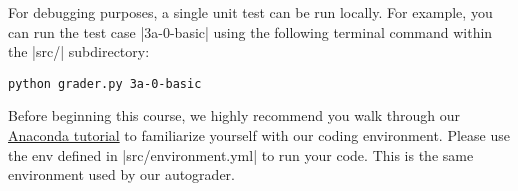 For debugging purposes, a single unit test can be run locally.  For example, you
can run the test case |3a-0-basic| using the following terminal command within
the |src/| subdirectory:
\begin{lstlisting}
python grader.py 3a-0-basic
\end{lstlisting}

Before beginning this course, we highly recommend you walk through our
\href{https://stanford.box.com/s/nvkolsrl6nhd00u8oeypj0ojloivhm5n}{Anaconda
tutorial} to familiarize yourself with
our coding environment.  Please use the env defined in |src/environment.yml|
to run your code.  This is the same environment used by our autograder.

